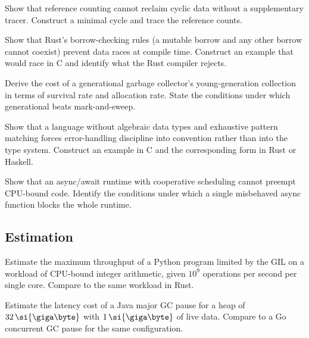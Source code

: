 \begin{exercise}
Show that reference counting cannot reclaim cyclic data without a supplementary tracer. Construct a minimal cycle and trace the reference counts.
\end{exercise}

\begin{exercise}
Show that Rust's borrow-checking rules (a mutable borrow and any other borrow cannot coexist) prevent data races at compile time. Construct an example that would race in C and identify what the Rust compiler rejects.
\end{exercise}

\begin{exercise}
Derive the cost of a generational garbage collector's young-generation collection in terms of survival rate and allocation rate. State the conditions under which generational beats mark-and-sweep.
\end{exercise}

\begin{exercise}
Show that a language without algebraic data types and exhaustive pattern matching forces error-handling discipline into convention rather than into the type system. Construct an example in C and the corresponding form in Rust or Haskell.
\end{exercise}

\begin{exercise}
Show that an async/await runtime with cooperative scheduling cannot preempt CPU-bound code. Identify the conditions under which a single misbehaved async function blocks the whole runtime.
\end{exercise}

\subsection*{Estimation}

\begin{exercise}
Estimate the maximum throughput of a Python program limited by the GIL on a workload of CPU-bound integer arithmetic, given $10^9$ operations per second per single core. Compare to the same workload in Rust.
\end{exercise}

\begin{exercise}
Estimate the latency cost of a Java major GC pause for a heap of $32\,\si{\giga\byte}$ with $1\,\si{\giga\byte}$ of live data. Compare to a Go concurrent GC pause for the same configuration.
\end{exercise}

